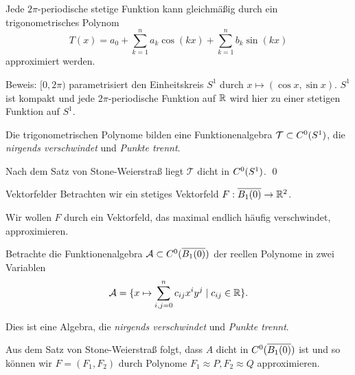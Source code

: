 \begin{frame}
    \begin{satz}
        Jede \(2\pi\)-periodische stetige Funktion kann gleichmäßig durch ein trigonometrisches Polynom 
        \[ T(x) = a_0 + \sum_{k=1}^n a_k \cos(kx) + \sum_{k=1}^n b_k \sin(kx) \]
        approximiert werden.
    \end{satz}
    \pause
    Beweis:
    \( [0,2\pi) \) parametrisiert den Einheitskreis \(S^1\) durch \( x \mapsto (\cos x, \sin x) \). 
    \pause
    \(S^1\) ist kompakt und jede \(2\pi\)-periodische Funktion auf \(\mathbb{R}\) wird hier zu einer 
    stetigen Funktion auf \(S^1\).
    \pause

    Die trigonometrischen Polynome bilden eine Funktionenalgebra \( \mathcal{T} \subset C^0(S^1) \), 
    die \textit{nirgends verschwindet} und \textit{Punkte trennt}.
    \pause

    Nach dem Satz von Stone-Weierstraß liegt \( \mathcal{T} \) dicht in \( C^0(S^1) \). \qed
\end{frame}

\newcommand{\B}{\overline{B_1(0)}}

\begin{frame}{Vektorfelder}
    Betrachten wir ein stetiges Vektorfeld 
    \( \abb{F}{\B}{\R^2} \).\pause

    Wir wollen \( F \) durch ein Vektorfeld, das maximal endlich 
    häufig verschwindet, approximieren.
    \pause

    Betrachte die Funktionenalgebra \( \A \subset \C(\B) \) 
    der reellen Polynome in zwei Variablen \pause
    \[ \mathcal{A} = \{ x \mapsto \sum_{i,j=0}^n c_{ij} x^i y^j \;|\; c_{ij} \in \mathbb{R} \}. \]
    \pause

    Dies ist eine Algebra, die \textit{nirgends verschwindet} und \textit{Punkte trennt}.
    \pause

    Aus dem Satz von Stone-Weierstraß folgt, dass \(A\) dicht in \( \C(\B) \) ist 
    und so können wir \( F = (F_1, F_2) \) durch Polynome 
    \( F_1 \approx P, F_2 \approx Q \) approximieren.
\end{frame}